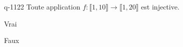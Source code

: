 \begin{truefalse}{q-1122}
Toute application $f : \llbracket 1, 10 \rrbracket \to \llbracket 1, 20 \rrbracket$ est injective.
\item Vrai
\item* Faux
\end{truefalse}

